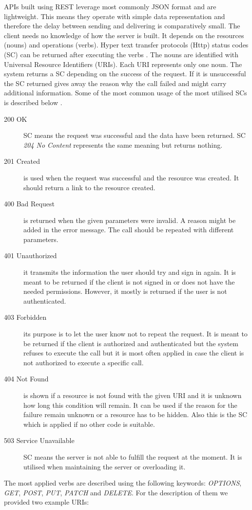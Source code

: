 APIs built using REST leverage most commonly JSON format and are lightweight. This means they operate with simple data representation and therefore the delay between sending and delivering is comparatively small. The client needs no knowledge of how the server is built. It depends on the resources (nouns) and operations (verbs). Hyper text transfer protocols (Http) status codes (SC) can be returned after executing the verbs \cite{rfc-2616}. The nouns are identified with Universal Resource Identifiers (URIs). Each URI represents only one noun. \linebreak[4] The system returns a SC depending on the success of the request. If it is unsuccessful the SC returned gives away the reason why \linebreak[4] the call failed and might carry additional information. Some of \linebreak[4] the most common usage of the most utilised SCs is described below \cite{httpmethods}.
\begin {description}
\item [200 OK] SC means the request was successful and the data have been returned. SC \textit{204 No Content} represents the same meaning but returns nothing.
\item [201 Created] is used when the request was successful and the resource was created. It should return a link to the resource created.
\item [400 Bad Request] is returned when the given parameters were invalid. A reason might be added in the error message. The call should be repeated with different parameters.
\item [401 Unauthorized] it transmits the information the user should try and sign in again. It is meant to be returned if the client is not signed in or does not have the needed permissions. However, it mostly is returned if the user is not authenticated.
\item [403 Forbidden] its purpose is to let the user know not to repeat the request. It is meant to be returned if the client is authorized and authenticated but the system refuses to execute the call but it is most often applied in case the client is not authorized to execute a specific call.
\item [404 Not Found] is shown if a resource is not found with the given URI and it is unknown how long this condition will remain. It can be used if the reason for the failure remain unknown or a resource has to be hidden. Also this is the SC which is applied if no other code is suitable.
\item [503 Service Unavailable] SC means the server is not able to fulfill the request at the moment. It is utilised when maintaining the server or overloading it.
\end{description}	
The most applied verbs are described using the following keywords: \textit{OPTIONS}, \textit{GET}, \textit{POST}, \textit{PUT}, \textit{PATCH} and \textit{DELETE}. For the description of them we provided two example URIs:

